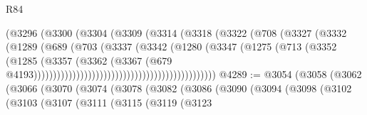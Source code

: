 \begin{lexlean}{R84}
\begin{coremodule}
                                                (@3296
                                                  (@3300
                                                    (@3304
                                                      (@3309
                                                        (@3314
                                                          (@3318
                                                            (@3322
                                                              (@708
                                                                (@3327
                                                                  (@3332
                                                                    (@1289
                                                                      (@689
                                                                        (@703
                                                                          (@3337
                                                                            (@3342
                                                                              (@1280
                                                                                (@3347
                                                                                  (@1275
                                                                                    (@713
                                                                                      (@3352
                                                                                        (@1285
                                                                                          (@3357
                                                                                            (@3362
                                                                                              (@3367
                                                                                                (@679
                                                                                                  @4193)))))))))))))))))))))))))))))))))))))))))))))))
@4289 := @3054
    (@3058
      (@3062
        (@3066
          (@3070
            (@3074
              (@3078
                (@3082
                  (@3086
                    (@3090
                      (@3094
                        (@3098
                          (@3102
                            (@3103
                              (@3107
                                (@3111
                                  (@3115
                                    (@3119
                                      (@3123

\end{coremodule}
\end{lexlean}
